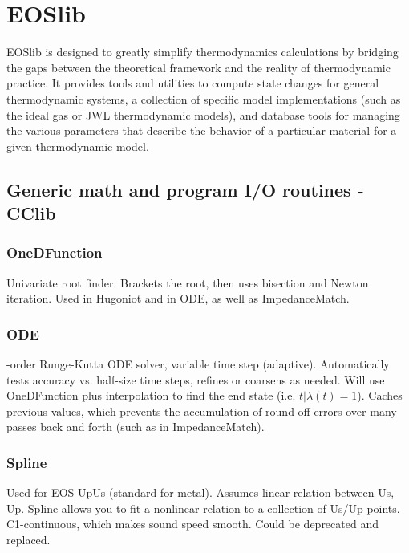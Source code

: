 \documentclass[twocolumn,10pt]{asme2ej}
\begin{document}

\section{EOSlib}

EOSlib is designed to greatly simplify thermodynamics calculations by bridging the gaps between the theoretical framework and the reality of thermodynamic practice. It provides tools and utilities to compute state changes for general thermodynamic systems, a collection of specific model implementations (such as the ideal gas or JWL thermodynamic models), and database tools for managing the various parameters that describe the behavior of a particular material for a given thermodynamic model. 

 

\subsection{Generic math and program I/O routines - CClib}

\subsubsection{OneDFunction}
Univariate root finder. Brackets the root, then uses bisection and Newton iteration. Used in Hugoniot and in ODE, as well as ImpedanceMatch.

\subsubsection{ODE}
-order Runge-Kutta ODE solver, variable time step (adaptive). Automatically tests accuracy vs. half-size time steps, refines or coarsens as needed. Will use OneDFunction plus interpolation to find the end state (i.e. $t|\lambda(t)=1$). Caches previous values, which prevents the accumulation of round-off errors over many passes back and forth (such as in ImpedanceMatch). 


\subsubsection{Spline}
Used for EOS UpUs (standard for metal). Assumes linear relation between Us, Up. Spline allows you to fit a nonlinear relation to a collection of Us/Up points. C1-continuous, which makes sound speed smooth. Could be deprecated and replaced.
\end{document}
